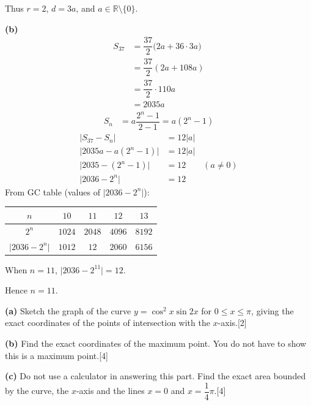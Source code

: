 \documentclass[a4paper,11pt,oneside]{article}
\newcommand{\Qhead}[1]{\par\needspace{14\baselineskip}\medskip\noindent{\large\bfseries #1}\par\smallskip}
\newcommand{\partlabel}[1]{\par\needspace{3\baselineskip}\smallskip\noindent\textbf{#1}\quad}
\newcommand{\mk}[1]{\hfill[#1]}
\begin{document}
\begin{solbox}
Thus $r=2$, $d=3a$, and $a\in\mathbb{R}\setminus\{0\}$.
\partlabel{(b)}
\begin{align*}
S_{37}
&= \dfrac{37}{2}\bigl(2a + 36\cdot 3a\bigr)\\
&= \dfrac{37}{2}(2a + 108a)\\
&= \dfrac{37}{2}\cdot 110a\\
&= 2035a
\end{align*}
\begin{align*}
S_n &= a\dfrac{2^n - 1}{2-1} = a(2^n - 1)
\end{align*}
\begin{align*}
\bigl|S_{37} - S_n\bigr| &= 12|a|\\
\bigl|2035a - a(2^n - 1)\bigr| &= 12|a|\\
\bigl|2035 - (2^n - 1)\bigr| &= 12
\qquad (a\neq 0)\\
\bigl|2036 - 2^n\bigr| &= 12
\end{align*}
From GC table (values of $\bigl|2036-2^n\bigr|$):
\begin{center}
\begin{tabular}{c|cccc}
$n$ & $10$ & $11$ & $12$ & $13$ \\
\hline
$2^n$ & $1024$ & $2048$ & $4096$ & $8192$ \\
$\bigl|2036-2^n\bigr|$ & $1012$ & $12$ & $2060$ & $6156$
\end{tabular}
\end{center}
When $n=11$, $\bigl|2036-2^{11}\bigr|=12$.

Hence $n=11$.
\end{solbox}
\clearpage
\Qhead{5}
\partlabel{(a)}
Sketch the graph of the curve $y = \cos^2 x\sin 2x$ for $0\le x\le\pi$, giving the exact coordinates of the points of intersection with the $x$-axis.\mk{2}



\partlabel{(b)}
Find the exact coordinates of the maximum point. You do not have to show this is a maximum point.\mk{4}



\partlabel{(c)}
Do not use a calculator in answering this part.
Find the exact area bounded by the curve, the $x$-axis and the lines $x=0$ and $x=\dfrac{1}{4}\pi$.\mk{4}
\end{document}
